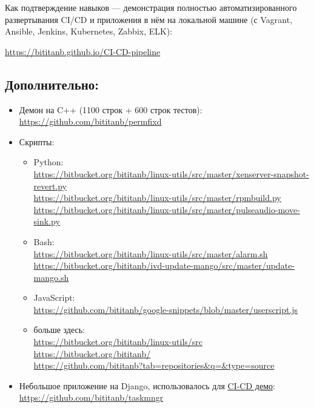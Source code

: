 \documentclass[10pt, a4paper]{article}
\begin{document}
Как подтверждение навыков — демонстрация полностью автоматизированного развертывания CI/CD и приложения в нём на локальной машине (с Vagrant, Ansible, Jenkins, Kubernetes, Zabbix, ELK):

\url{https://bititanb.github.io/CI-CD-pipeline}

\subsection*{Дополнительно:}
\begin{itemize}
  \item Демон на C++ (1100 строк + 600 строк тестов):\\
    \url{https://github.com/bititanb/permfixd}
  \item Скрипты:
    \begin{itemize}
      \item Python:\\
        \url{https://bitbucket.org/bititanb/linux-utils/src/master/xenserver-snapshot-revert.py}\\
        \url{https://bitbucket.org/bititanb/linux-utils/src/master/rpmbuild.py}\\
        \url{https://bitbucket.org/bititanb/linux-utils/src/master/pulseaudio-move-sink.py}
      \item Bash:\\
        \url{https://bitbucket.org/bititanb/linux-utils/src/master/alarm.sh}\\
        \url{https://bitbucket.org/bititanb/ivd-update-mango/src/master/update-mango.sh}
      \item JavaScript:\\
        \url{https://github.com/bititanb/google-snippets/blob/master/userscript.js}
      \item больше здесь:\\
        \url{https://bitbucket.org/bititanb/linux-utils/src}\\
        \url{https://bitbucket.org/bititanb/}\\
        \url{https://github.com/bititanb?tab=repositories&q=&type=source}
    \end{itemize}
  \item Небольшое приложение на Django, использовалось для \href{https://github.com/bititanb/CI-CD-pipeline}{CI-CD демо}:\\
    \url{https://github.com/bititanb/taskmngr}
\end{itemize}
\end{document}
